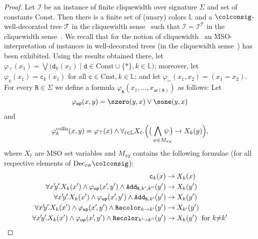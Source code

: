 \documentclass[10pt,a4paper]{amsart}
\theoremstyle{definition}
\numberwithin{equation}{section}
\theoremstyle{plain}
\theoremstyle{definition}
\theoremstyle{myexample}
\theoremstyle{plain}
\theoremstyle{definition}
\newcommand{\instance}{\mathcal{I}}
\newcommand{\inst}{\instance}
\newcommand{\cols}{\mathbb{L}}
\newcommand{\arity}[1]{\fcn{ar}(#1)}
\newcommand{\fcn}[1]{\mathsf{#1}}
\newcommand{\pred}[1]{\mathtt{#1}}
\newcommand{\const}[1]{\mathtt{#1}}
\newcommand{\thephi}{\varphi}
\newcommand{\rpred}{\pred{R}}
\begin{document}
\begin{proof}
	Let $\inst$ be an instance of finite cliquewidth over signature $\Sigma$ and set of constants $\mathrm{Const}$. Then there is a finite set of (unary) colors $\cols$ and a $\colconsig$-well-decorated tree $\mathcal{T}$ in the cliquewidth sense~\cite[Definition 6]{ICDT2023} such that $\inst = \inst^{\mathcal{T}}$ in the cliquewidth sense~\cite[Definition 7]{ICDT2023}.
	We recall that for the notion of cliquewidth~\cite[Definition 8]{ICDT2023} an MSO-interpretation of instances in well-decorated trees (in the cliquewidth sense~\cite[Definition 6]{ICDT2023}) has been exhibited.
	Using the results obtained there, let $\varphi_{\top}(x_1) = \bigvee \big(\const{d}_k(x_1) \mid \const{d} \in \mathrm{Const} \cup\{\const{*}\}, k \in \cols\big)$; moreover, let  $ \varphi_{\const{c}}(x_1) = \const{c}_{k}(x_1)$ for all $\const{c}\in\mathrm{Cnst}, k\in\cols$; and let $\varphi_{=}(x_1, x_2) = (x_1 = x_2)$.
	For every $\rpred\in \Sigma$ we define a formula $\varphi_{\rpred}(x_1,\ldots, x_{\arity{\rpred}})$ as follows: Let
    	$$
    	\thephi_\fcn{up}(x,y) = \szero(y,x) \vee \sone(y,x)
    	$$
    	and
    	$$
    	\varphi^\mathrm{colIn}_{k}(x,y) = \varphi_{\top}(x) \wedge 
    	\forall_{\ell \in \cols} X_\ell. 
    	\Big(\big(\hspace{-3ex} \bigwedge_{\hspace{3ex}\psi \in M_{xy}}\hspace{-3ex}\psi\, \big) \to X_k(y)\Big),
    	$$%
    	where $X_\ell$ are MSO set variables and $M_{xy}$ contains the following formulae (for all respective elements of $\mathrm{Dec}_{\mathrm{cw}}\colconsig$):
    	\begin{align*}
    		\const{c}_k(x) & \to X_{k}(x)\\ 
    		\forall x'\!y'\!. X_k(x') \wedge \thephi_\fcn{up}(x'\!,y') \wedge \pred{Add}_{\rpred,k',k''}(y') & \to X_{k}(y')\\ 
    		\forall x'\!y'\!. X_k(x') \wedge \thephi_\fcn{up}(x'\!,y') \wedge \pred{Add}_{\rpred,k'}(y') & \to X_{k}(y')\\ 
    		\forall x'\!y'\!. X_k(x') \wedge \thephi_\fcn{up}(x'\!,y') \wedge \pred{Recolor}_{k\to k'}(y') & \to X_{k'}(y')\\ 
    		\forall x'\!y'\!. X_k(x') \wedge \thephi_\fcn{up}(x'\!,y') \wedge \pred{Recolor}_{k'\!\to k''}(y') & \to X_{k}(y')\hspace{1.5ex}\text{for }k{\neq} k'\\ 

\end{align*}
\end{proof}
\end{document}
